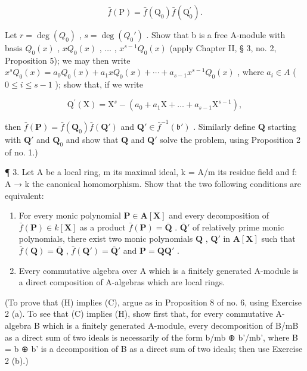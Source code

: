 \[
\bar {f} (\mathrm{P}) = \bar {f} (\mathrm{Q} _ {0}) \bar {f} (\mathrm{Q} _ {0} ^ {\prime}).
\]

Let \(r = \deg(Q_0)\) , \(s = \deg(Q_0')\) . Show that b is a free A-module with basis \(Q_0(x)\) , \(xQ_0(x)\) , \(\ldots\) , \(x^{s-1}Q_0(x)\) (apply Chapter II, § 3, no. 2, Proposition 5); we may then write \(x^sQ_0(x) = a_0Q_0(x) + a_1xQ_0(x) + \cdots + a_{s-1}x^{s-1}Q_0(x)\) , where \(a_i \in A\) ( \(0 \leqslant i \leqslant s-1\) ); show that, if we write

\[
\mathrm{Q} ^ {\prime} (\mathrm{X}) = \mathrm{X} ^ {s} - (a _ {0} + a _ {1} \mathrm{X} + \dots + a _ {s - 1} \mathrm{X} ^ {s - 1}),
\]

then \(\bar{f}(\mathbf{P}) = \bar{f}(\mathbf{Q}_0)\bar{f}(\mathbf{Q}')\) and \(\mathbf{Q}'\in \bar{f}^{-1}(\mathfrak{b}')\) . Similarly define \(\mathbf{Q}\) starting with \(\mathbf{Q}'\) and \(\mathbf{Q}_0\) and show that \(\mathbf{Q}\) and \(\mathbf{Q}'\) solve the problem, using Proposition 2 of no. 1.)

¶ 3. Let A be a local ring, m its maximal ideal, k = A/m its residue field and f: A → k the canonical homomorphism. Show that the two following conditions are equivalent:

\begin{enumerate}
\def\labelenumi{(\Alph{enumi})}
\setcounter{enumi}{7}
\item[(H)]
  For every monic polynomial \(\mathbf{P} \in \mathbf{A}[\mathbf{X}]\) and every decomposition of \(\bar{f}(\mathbf{P}) \in k[\mathbf{X}]\) as a product \(\bar{f}(\mathbf{P}) = \overline{\mathbf{Q}}\) . \(\overline{\mathbf{Q}}'\) of relatively prime monic polynomials, there exist two monic polynomials \(\mathbf{Q}\) , \(\mathbf{Q}'\) in \(\mathbf{A}[\mathbf{X}]\) such that \(\bar{f}(\mathbf{Q}) = \overline{\mathbf{Q}}\) , \(\bar{f}(\mathbf{Q}') = \overline{\mathbf{Q}}'\) and \(\mathbf{P} = \mathbf{QQ'}\) .
\item[(C)]
  Every commutative algebra over A which is a finitely generated A-module is a direct composition of A-algebras which are local rings.
\end{enumerate}

(To prove that (H) implies (C), argue as in Proposition 8 of no. 6, using Exercise 2 (a). To see that (C) implies (H), show first that, for every commutative A-algebra B which is a finitely generated A-module, every decomposition of B/mB as a direct sum of two ideals is necessarily of the form b/mb ⊕ b'/mb', where B = b ⊕ b' is a decomposition of B as a direct sum of two ideals; then use Exercise 2 (b).)

